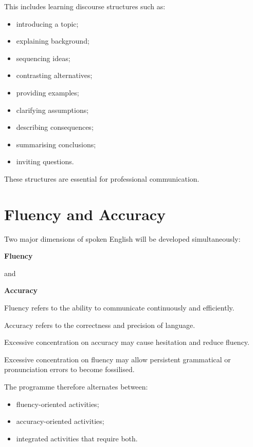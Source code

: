 This includes learning discourse structures such as:

\begin{itemize}
    \item introducing a topic;
    \item explaining background;
    \item sequencing ideas;
    \item contrasting alternatives;
    \item providing examples;
    \item clarifying assumptions;
    \item describing consequences;
    \item summarising conclusions;
    \item inviting questions.
\end{itemize}

These structures are essential for professional communication.

\section*{Fluency and Accuracy}

Two major dimensions of spoken English will be developed simultaneously:

\begin{center}
\textbf{Fluency}
\end{center}

and

\begin{center}
\textbf{Accuracy}
\end{center}

Fluency refers to the ability to communicate continuously and efficiently.

Accuracy refers to the correctness and precision of language.

Excessive concentration on accuracy may cause hesitation and reduce fluency.

Excessive concentration on fluency may allow persistent grammatical or pronunciation errors to become fossilised.

The programme therefore alternates between:

\begin{itemize}
    \item fluency-oriented activities;
    \item accuracy-oriented activities;
    \item integrated activities that require both.
\end{itemize}

